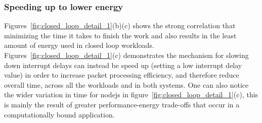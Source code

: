 






\subsubsection{Speeding up to lower energy}
Figures~\ref{fig:closed_loop_detail_1}(b)(c) shows the strong correlation that minimizing the time it takes to finish the work and also results in the least amount of energy used in closed loop workloads. Figures~\ref{fig:closed_loop_detail_1}(c) demonstrates the mechanism for slowing down interrupt delays can instead be speed up (setting a low interrupt delay value) in order to increase packet processing efficiency, and therefore reduce overall time, across all the workloads and in both systems. One can also notice the wider variation in time for nodejs in figure~\ref{fig:closed_loop_detail_1}(c), this is mainly the result of greater performance-energy trade-offs that occur in a computationally bound application.

